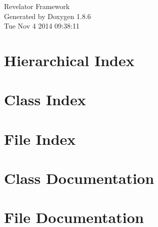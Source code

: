 \documentclass[twoside]{book}
\newcommand{\clearemptydoublepage}{%
  \newpage{\pagestyle{empty}\cleardoublepage}%
}
\begin{document}
\hypersetup{pageanchor=false}
\begin{titlepage}
\vspace*{7cm}
\begin{center}%
{\Large Revelator Framework }\\
\vspace*{1cm}
{\large Generated by Doxygen 1.8.6}\\
\vspace*{0.5cm}
{\small Tue Nov 4 2014 09:38:11}\\
\end{center}
\end{titlepage}
\clearemptydoublepage
\tableofcontents
\clearemptydoublepage
{}
\hypersetup{pageanchor=true}

\chapter{Hierarchical Index}

\chapter{Class Index}

\chapter{File Index}

\chapter{Class Documentation}



















\chapter{File Documentation}






































\newpage
{}
{}
\printindex
\end{document}
